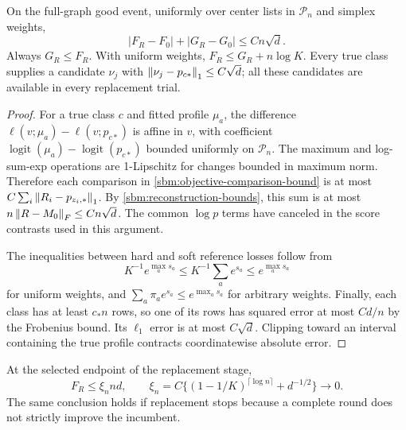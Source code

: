 \begin{lemma}
\label{sbm:objective-comparison}
On the full-graph good event, uniformly over center lists in
$\mathcal P_n$ and simplex weights,
\begin{equation}
 |F_R-F_0|+|G_R-G_0|\le Cn\sqrt d.
 \label{sbm:objective-comparison-bound}
\end{equation}
Always $G_R\le F_R$. With uniform weights,
$F_R\le G_R+n\log K$. Every true class supplies a candidate $\nu_j$
with $\left\lVert\nu_j-p_{c*}\right\rVert_1\le C\sqrt d$; all these candidates are
available in every replacement trial.
\end{lemma}

\begin{proof}
For a true class $c$ and fitted profile $\mu_a$, the difference
$\ell(v;\mu_a)-\ell(v;p_{c*})$ is affine in $v$, with coefficient
$\operatorname{logit}(\mu_a)-\operatorname{logit}(p_{c*})$ bounded
uniformly on $\mathcal P_n$. The maximum and log-sum-exp operations are
1-Lipschitz for changes bounded in maximum norm. Therefore each
comparison in \eqref{sbm:objective-comparison-bound} is at most
$C\sum_i\left\lVert R_i-p_{z_i,*}\right\rVert_1$. By
\eqref{sbm:reconstruction-bounds}, this sum is at most
$n\left\lVert R-M_0\right\rVert_F\le Cn\sqrt d$. The common $\log p$ terms have
canceled in the score contrasts used in this argument.

The inequalities between hard and soft reference losses follow from
\[
 K^{-1}e^{\max_a s_a}\le K^{-1}\sum_a e^{s_a}
 \le e^{\max_a s_a}
\]
for uniform weights, and
$\sum_a\pi_a e^{s_a}\le e^{\max_a s_a}$ for arbitrary weights.
Finally, each class has at least $c_*n$ rows, so one of its rows has
squared error at most $Cd/n$ by the Frobenius bound. Its $\ell_1$
error is at most $C\sqrt d$. Clipping toward an interval containing
the true profile contracts coordinatewise absolute error.
\end{proof}

\begin{lemma}
\label{sbm:replacement}
At the selected endpoint of the replacement stage,
\begin{equation}
 F_R\le \xi_n nd,\qquad
 \xi_n=C\{(1-1/K)^{\lceil\log n\rceil}+d^{-1/2}\}\longrightarrow0.
 \label{sbm:certificate}
\end{equation}
The same conclusion holds if replacement stops because a complete
round does not strictly improve the incumbent.
\end{lemma}

